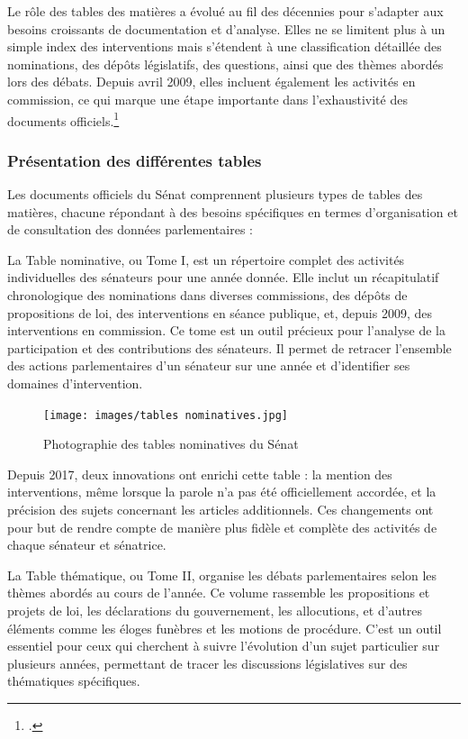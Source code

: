 Le rôle des tables des matières a évolué au fil des décennies pour s'adapter aux besoins croissants de documentation et d'analyse. Elles ne se limitent plus à un simple index des interventions mais s'étendent à une classification détaillée des nominations, des dépôts législatifs, des questions, ainsi que des thèmes abordés lors des débats. Depuis avril 2009, elles incluent également les activités en commission, ce qui marque une étape importante dans l'exhaustivité des documents officiels.\footcite{senat_tables_debats}

\subsubsection{Présentation des différentes tables}

Les documents officiels du Sénat comprennent plusieurs types de tables des matières, chacune répondant à des besoins spécifiques en termes d'organisation et de consultation des données parlementaires :


La Table nominative, ou Tome I, est un répertoire complet des activités individuelles des sénateurs pour une année donnée. Elle inclut un récapitulatif chronologique des nominations dans diverses commissions, des dépôts de propositions de loi, des interventions en séance publique, et, depuis 2009, des interventions en commission. Ce tome est un outil précieux pour l’analyse de la participation et des contributions des sénateurs. Il permet de retracer l’ensemble des actions parlementaires d’un sénateur sur une année et d’identifier ses domaines d’intervention.

\begin{figure}[H]
    \centering
    \texttt{[image: images/tables nominatives.jpg]}
    \caption{Photographie des tables nominatives du Sénat}
\end{figure}

Depuis 2017, deux innovations ont enrichi cette table : la mention des interventions, même lorsque la parole n'a pas été officiellement accordée, et la précision des sujets concernant les articles additionnels. Ces changements ont pour but de rendre compte de manière plus fidèle et complète des activités de chaque sénateur et sénatrice.


La Table thématique, ou Tome II, organise les débats parlementaires selon les thèmes abordés au cours de l’année. Ce volume rassemble les propositions et projets de loi, les déclarations du gouvernement, les allocutions, et d’autres éléments comme les éloges funèbres et les motions de procédure. C'est un outil essentiel pour ceux qui cherchent à suivre l'évolution d'un sujet particulier sur plusieurs années, permettant de tracer les discussions législatives sur des thématiques spécifiques.

